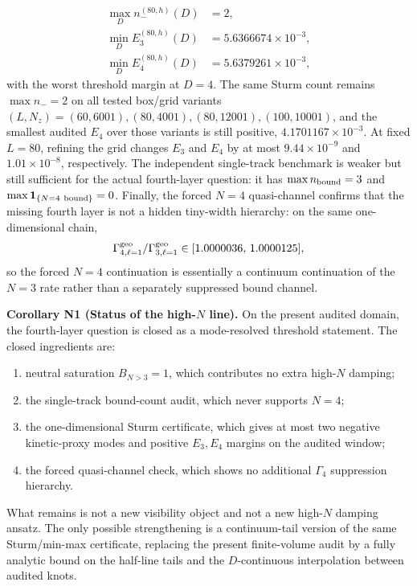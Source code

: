\documentclass[aps,prd,onecolumn,notitlepage,nofootinbib,superscriptaddress,11pt,floatfix]{revtex4-2}
\begin{document}
\[
\begin{aligned}
\max_D n_-^{(80,h)}(D)&=2,\\
\min_D E_3^{(80,h)}(D)&=5.6366674\times10^{-3},\\
\min_D E_4^{(80,h)}(D)&=5.6379261\times10^{-3},
\end{aligned}
\]
with the worst threshold margin at \(D=4\).  The same Sturm count remains \(\max n_-=2\) on all tested box/grid variants \((L,N_z)=(60,6001),(80,4001),(80,12001),(100,10001)\), and the smallest audited \(E_4\) over those variants is still positive, \(4.1701167\times10^{-3}\).  At fixed \(L=80\), refining the grid changes \(E_3\) and \(E_4\) by at most \(9.44\times10^{-9}\) and \(1.01\times10^{-8}\), respectively.  The independent single-track benchmark is weaker but still sufficient for the actual fourth-layer question: it has \(\max n_{\rm bound}=3\) and \(\max{\bf 1}_{\{N=4\ {\rm bound}\}}=0\).  Finally, the forced \(N=4\) quasi-channel confirms that the missing fourth layer is not a hidden tiny-width hierarchy: on the same one-dimensional chain,
\[
\Gamma_{4,\ell=1}^{\rm geo}/\Gamma_{3,\ell=1}^{\rm geo}
\in[1.0000036,\,1.0000125],
\]
so the forced \(N=4\) continuation is essentially a continuum continuation of the \(N=3\) rate rather than a separately suppressed bound channel.

\medskip\noindent\textbf{Corollary N1 (Status of the high-\texorpdfstring{$N$}{N} line).}
On the present audited domain, the fourth-layer question is closed as a mode-resolved threshold statement.  The closed ingredients are:
\begin{enumerate}
\item neutral saturation \(B_{N>3}=1\), which contributes no extra high-\(N\) damping;
\item the single-track bound-count audit, which never supports \(N=4\);
\item the one-dimensional Sturm certificate, which gives at most two negative kinetic-proxy modes and positive \(E_3,E_4\) margins on the audited window;
\item the forced quasi-channel check, which shows no additional \(\Gamma_4\) suppression hierarchy.
\end{enumerate}
What remains is not a new visibility object and not a new high-\(N\) damping ansatz.  The only possible strengthening is a continuum-tail version of the same Sturm/min-max certificate, replacing the present finite-volume audit by a fully analytic bound on the half-line tails and the \(D\)-continuous interpolation between audited knots.
\end{document}
